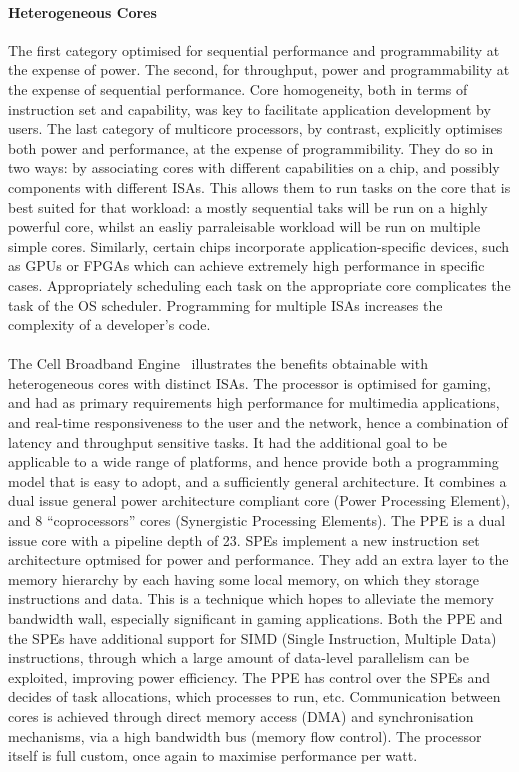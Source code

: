 \paragraph{Heterogeneous Cores} The first category optimised for 
sequential performance and programmability at the expense of power. The second, 
for throughput, power and programmability at the expense of sequential performance. 
Core homogeneity, both in terms of instruction set and capability,
was key to facilitate application development by users. The last category
of multicore processors, by contrast, explicitly optimises both
power and performance, at the expense of programmibility. They do so in two ways: 
by associating cores with different capabilities on a chip, and possibly components
with different ISAs. This allows them to run tasks on the core
that is best suited for that workload: a mostly sequential taks will be run 
on a highly powerful core, whilst an easliy parraleisable workload
will be run on multiple simple cores. Similarly, certain chips incorporate
application-specific devices, such as GPUs or FPGAs which can achieve extremely
high performance in specific cases. Appropriately scheduling each 
task on the appropriate core complicates the task of the OS scheduler.
Programming for multiple ISAs increases the complexity of a developer's code. 

\paragraph{}The Cell Broadband Engine~\cite{kahle2005cell} illustrates the benefits obtainable with heterogeneous
cores with distinct ISAs. The processor is optimised for gaming, and had as primary 
requirements high performance for multimedia applications, and real-time
responsiveness to the user and the network, hence a combination of 
latency and throughput sensitive tasks. It had the additional goal 
to be applicable to a wide range of platforms, and hence provide 
both a programming model that is easy to adopt, and a sufficiently
general architecture. It combines a dual issue general power architecture 
compliant core (Power Processing Element), and 8 ``coprocessors''
cores (Synergistic Processing Elements).  The PPE is a dual issue core with a 
pipeline depth of 23. SPEs implement a new instruction set
architecture optmised for power and performance. They add an extra layer
to the memory hierarchy by each having some local memory, on which they storage instructions and data.  This is a technique
which hopes to alleviate the memory bandwidth wall, especially significant in
gaming applications. Both the PPE and the SPEs have
additional support for SIMD (Single Instruction, Multiple Data) instructions, through
which a large amount of data-level parallelism can be exploited, improving
power efficiency. The PPE has control over the SPEs and decides of task allocations,
 which processes to run, etc. Communication between cores is achieved 
through direct memory access (DMA) and synchronisation
mechanisms, via a high bandwidth bus (memory flow control). The processor itself is full 
custom, once again to maximise performance per watt. 

